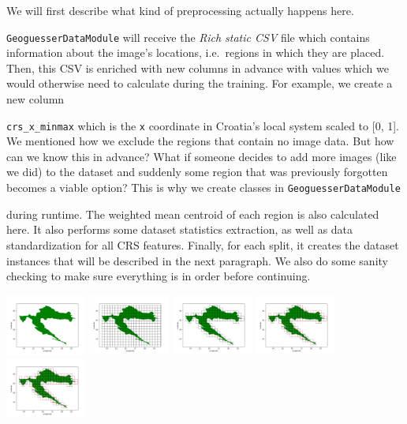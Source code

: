 \documentclass[]{article}
\let\oldtexttt\texttt
\renewcommand{\texttt}[1]{
  \textcolor{tcolor}{\colorbox{bgcolor}{\oldtexttt{#1}}}
}
\begin{document}
We will first describe what kind of preprocessing actually happens here.
\texttt{GeoguesserDataModule} will receive the \emph{Rich static CSV}
file which contains information about the image's locations,
i.e.~regions in which they are placed. Then, this CSV is enriched with
new columns in advance with values which we would otherwise need to
calculate during the training. For example, we create a new column
\texttt{crs\_x\_minmax} which is the \texttt{x} coordinate in Croatia's
local system scaled to {[}0, 1{]}. We mentioned how we exclude the
regions that contain no image data. But how can we know this in advance?
What if someone decides to add more images (like we did) to the dataset
and suddenly some region that was previously forgotten becomes a viable
option? This is why we create classes in \texttt{GeoguesserDataModule}
during runtime. The weighted mean centroid of each region is also
calculated here. It also performs some dataset statistics extraction, as
well as data standardization for all CRS features. Finally, for each
split, it creates the dataset instances that will be described in the
next paragraph. We also do some sanity checking to make sure everything
is in order before continuing.

\includegraphics[width=0.2\textwidth,height=\textheight]{./tex2pdf.-3ffa51a14b505aec/783054b69ce1a362c2b297056713df2e3d6f6354.png}
\includegraphics[width=0.2\textwidth,height=\textheight]{./tex2pdf.-3ffa51a14b505aec/772e5e74aac612731491798f7cec020ae484a746.png}
\includegraphics[width=0.2\textwidth,height=\textheight]{./tex2pdf.-3ffa51a14b505aec/c54353cff7765aae92300015bc3cf1a99a97e063.png}
\includegraphics[width=0.2\textwidth,height=\textheight]{./tex2pdf.-3ffa51a14b505aec/3dd2e95d779584d4ad600ed2f81325d11fbc5e59.png}
\includegraphics[width=0.2\textwidth,height=\textheight]{./tex2pdf.-3ffa51a14b505aec/4679e1b7c27bc8692ea368917a0c15cb2b2385be.png}
\end{document}

